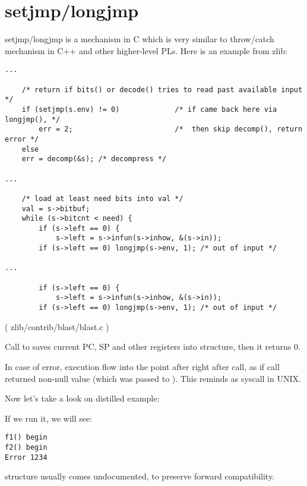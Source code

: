 \section{setjmp/longjmp}


setjmp/longjmp is a mechanism in C which is very similar to throw/catch mechanism in C++ and other higher-level \ac{PL}s.
Here is an example from zlib:

\begin{lstlisting}
...

    /* return if bits() or decode() tries to read past available input */
    if (setjmp(s.env) != 0)             /* if came back here via longjmp(), */
        err = 2;                        /*  then skip decomp(), return error */
    else
	err = decomp(&s); /* decompress */

...

    /* load at least need bits into val */
    val = s->bitbuf;
    while (s->bitcnt < need) {
        if (s->left == 0) {
            s->left = s->infun(s->inhow, &(s->in));
	    if (s->left == 0) longjmp(s->env, 1); /* out of input */

...

        if (s->left == 0) {
            s->left = s->infun(s->inhow, &(s->in));
	    if (s->left == 0) longjmp(s->env, 1); /* out of input */
\end{lstlisting}
( zlib/contrib/blast/blast.c )

Call to  saves current \ac{PC}, \ac{SP} and other registers into  structure, then it returns 0.

In case of error,   execution flow into the point after right after  call,
as if  call returned non-null value (which was passed to ).
This reminds as  syscall in UNIX.

Now let's take a look on distilled example:



If we run it, we will see:

\begin{lstlisting}
f1() begin
f2() begin
Error 1234
\end{lstlisting}

 structure usually comes undocumented, to preserve forward compatibility.

